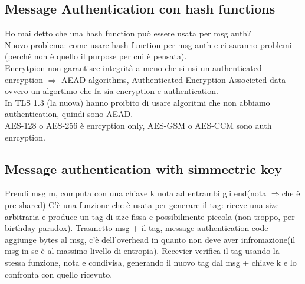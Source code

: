 \documentclass[16px]{article}
\begin{document}
\subsection{Message Authentication con hash functions}
Ho mai detto che una hash function può essere usata per msg auth?\\
Nuovo problema: come usare hash function per msg auth e ci saranno problemi (perché non è quello il purpose per cui è pensata).\\
Encrytpion non garantisce integrità a meno che si usi un authenticated enrcyption $\Rightarrow$ AEAD algorithms, Authenticated Encryption Associeted data ovvero un algortimo che fa sia encryption e authentication.\\ In TLS 1.3 (la nuova) hanno proibito di usare algoritmi che non abbiamo authentication, quindi sono AEAD.\\
AES-128 o AES-256 è enrcyption only, AES-GSM o AES-CCM sono auth enrcyption.\\
\subsection{Message authentication with simmectric key}
Prendi msg m, computa con una chiave k nota ad entrambi gli end(nota $\Rightarrow $che è pre-shared)
C'è una funzione che è usata per generare il tag: riceve una size arbitraria e produce un tag di size fissa e possibilmente piccola (non troppo, per birthday paradox).
Trasmetto msg + il tag, message authentication code aggiunge bytes al msg, c'è dell'overhead in quanto non deve aver infromazione(il msg in se è al massimo livello di entropia).
Recevier verifica il tag usando la stessa funzione, nota e condivisa, generando il nuovo tag dal msg + chiave k e lo confronta con quello ricevuto.\\
\end{document}
